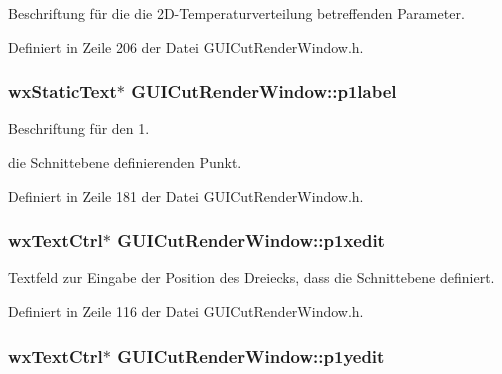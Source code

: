 Beschriftung für die die 2\-D-\/\-Temperaturverteilung betreffenden Parameter. 



Definiert in Zeile 206 der Datei G\-U\-I\-Cut\-Render\-Window.\-h.

\hypertarget{classGUICutRenderWindow_ac28961397f75c1d67dd1d983cda586f8}{
\subsubsection[{p1label}]{\setlength{\rightskip}{0pt plus 5cm}wx\-Static\-Text$\ast$ G\-U\-I\-Cut\-Render\-Window\-::p1label\hspace{0.3cm}{\ttfamily [private]}}}\label{classGUICutRenderWindow_ac28961397f75c1d67dd1d983cda586f8}


Beschriftung für den 1. 

die Schnittebene definierenden Punkt. 

Definiert in Zeile 181 der Datei G\-U\-I\-Cut\-Render\-Window.\-h.

\hypertarget{classGUICutRenderWindow_a509b5ca573c287e3863e952ec629fa7b}{
\subsubsection[{p1xedit}]{\setlength{\rightskip}{0pt plus 5cm}wx\-Text\-Ctrl$\ast$ G\-U\-I\-Cut\-Render\-Window\-::p1xedit\hspace{0.3cm}{\ttfamily [private]}}}\label{classGUICutRenderWindow_a509b5ca573c287e3863e952ec629fa7b}


Textfeld zur Eingabe der Position des Dreiecks, dass die Schnittebene definiert. 



Definiert in Zeile 116 der Datei G\-U\-I\-Cut\-Render\-Window.\-h.

\hypertarget{classGUICutRenderWindow_a93e837c15d8c6e7f420fd457c49024f2}{
\subsubsection[{p1yedit}]{\setlength{\rightskip}{0pt plus 5cm}wx\-Text\-Ctrl$\ast$ G\-U\-I\-Cut\-Render\-Window\-::p1yedit\hspace{0.3cm}{\ttfamily [private]}}}\label{classGUICutRenderWindow_a93e837c15d8c6e7f420fd457c49024f2}


